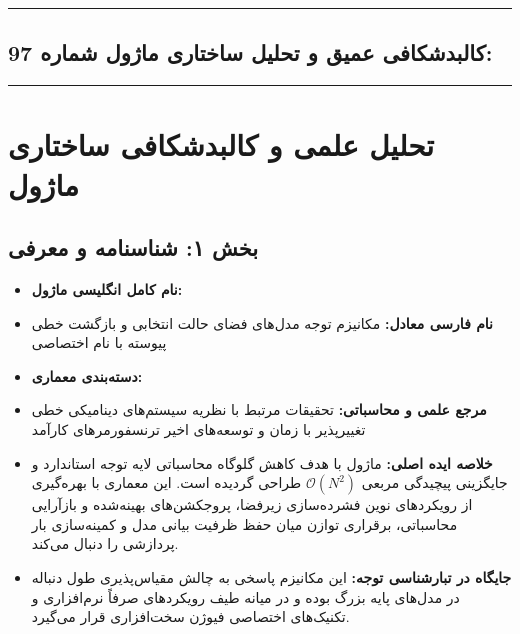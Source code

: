 \clearpage
{}
\vspace*{0.2cm}
\noindent\rule{\textwidth}{1.2pt}\vspace{-0.2cm}
\subsection{کالبدشکافی عمیق و تحلیل ساختاری ماژول شماره 97: }
\label{sec:retention}
\vspace{-0.2cm}\noindent\rule{\textwidth}{0.5pt}
\vspace{0.4cm}
\section{تحلیل علمی و کالبدشکافی ساختاری ماژول }

\subsection*{بخش ۱: شناسنامه و معرفی }
\begin{itemize}
    \item \textbf{نام کامل انگلیسی ماژول:} 
    \item \textbf{نام فارسی معادل:} مکانیزم توجه مدل‌های فضای حالت انتخابی و بازگشت خطی پیوسته با نام اختصاصی 
    \item \textbf{دسته‌بندی معماری:} 
    \item \textbf{مرجع علمی و محاسباتی:} تحقیقات مرتبط با نظریه سیستم‌های دینامیکی خطی تغییرپذیر با زمان  و توسعه‌های اخیر ترنسفورمرهای کارآمد
    \item \textbf{خلاصه ایده اصلی:} ماژول  با هدف کاهش گلوگاه محاسباتی لایه توجه استاندارد و جایگزینی پیچیدگی مربعی $\mathcal{O}(N^2)$ طراحی گردیده است. این معماری با بهره‌گیری از رویکردهای نوین فشرده‌سازی زیرفضا، پروجکشن‌های بهینه‌شده و بازآرایی محاسباتی، برقراری توازن میان حفظ ظرفیت بیانی مدل و کمینه‌سازی بار پردازشی را دنبال می‌کند.
    \item \textbf{جایگاه در تبارشناسی توجه:} این مکانیزم پاسخی به چالش مقیاس‌پذیری طول دنباله در مدل‌های پایه بزرگ بوده و در میانه طیف رویکردهای صرفاً نرم‌افزاری و تکنیک‌های اختصاصی فیوژن سخت‌افزاری قرار می‌گیرد.
\end{itemize}

